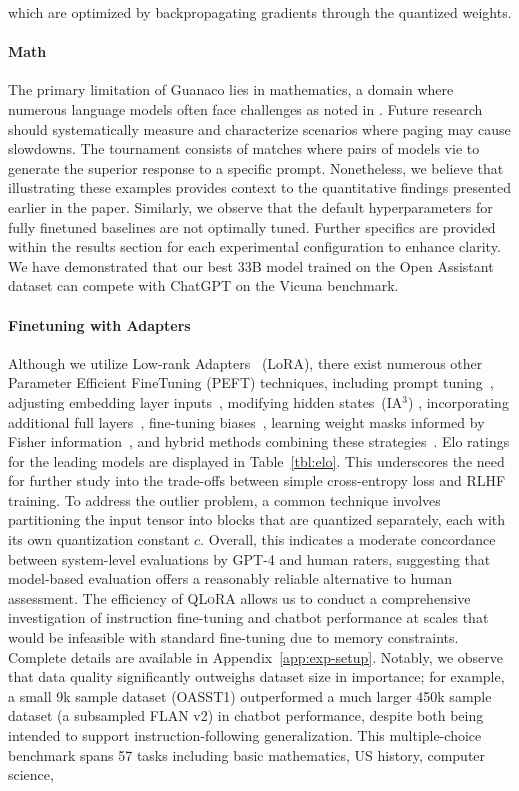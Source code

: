 which are optimized by backpropagating gradients through the quantized weights. \paragraph{Math} The primary limitation of {Guanaco} lies in mathematics, a domain where numerous language models often face challenges as noted in \citep{liang2022holistic}. Future research should systematically measure and characterize scenarios where paging may cause slowdowns. The tournament consists of matches where pairs of models vie to generate the superior response to a specific prompt. Nonetheless, we believe that illustrating these examples provides context to the quantitative findings presented earlier in the paper. Similarly, we observe that the default hyperparameters for fully finetuned baselines are not optimally tuned. Further specifics are provided within the results section for each experimental configuration to enhance clarity. We have demonstrated that our best 33B model trained on the Open Assistant dataset can compete with ChatGPT on the Vicuna benchmark. \paragraph{Finetuning with Adapters} Although we utilize Low-rank Adapters~\citep{hu2021lora} (LoRA), there exist numerous other Parameter Efficient FineTuning (PEFT) techniques, including prompt tuning~\citep{qin2021learning,lester2021power,li2021prefix}, adjusting embedding layer inputs~\citep{an2022input}, modifying hidden states~(IA$^3$) \citep{liu2022few}, incorporating additional full layers~\citep{houlsby2019parameter}, fine-tuning biases~\citep{zaken2021bitfit}, learning weight masks informed by Fisher information~\citep{sung2021training}, and hybrid methods combining these strategies~\citep{henderson2021compacter}. Elo ratings for the leading models are displayed in Table~\ref{tbl:elo}. This underscores the need for further study into the trade-offs between simple cross-entropy loss and RLHF training. To address the outlier problem, a common technique involves partitioning the input tensor into blocks that are quantized separately, each with its own quantization constant $c$. Overall, this indicates a moderate concordance between system-level evaluations by GPT-4 and human raters, suggesting that model-based evaluation offers a reasonably reliable alternative to human assessment. The efficiency of \textsc{QLoRA} allows us to conduct a comprehensive investigation of instruction fine-tuning and chatbot performance at scales that would be infeasible with standard fine-tuning due to memory constraints. Complete details are available in Appendix~\ref{app:exp-setup}. Notably, we observe that data quality significantly outweighs dataset size in importance; for example, a small 9k sample dataset (OASST1) outperformed a much larger 450k sample dataset (a subsampled FLAN v2) in chatbot performance, despite both being intended to support instruction-following generalization. This multiple-choice benchmark spans 57 tasks including basic mathematics, US history, computer science, 